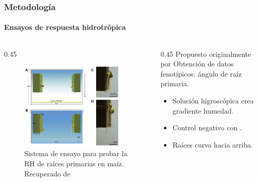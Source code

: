 \documentclass[9pt,aspectratio=169]{beamer}
\begin{document}
\begin{frame}
    \frametitle{Metodología}
    \framesubtitle{Ensayos de respuesta hidrotrópica}

\begin{columns}[c]
    \begin{column}{0.45\textwidth}
        \begin{figure}
            \centering
            \includegraphics[width=0.90\textwidth]{metodologia-ensayo-hidrotropico.png}
            \caption{Sistema de ensayo para probar la RH de raíces primarias en maíz. Recuperado de \textcite{eapen-2017-hidrotropismo}}
            \label{fig:ensayo-hidrotropico}
        \end{figure}
    \end{column}

    \begin{column}{0.45\textwidth}
        Propuesto originalmente por \textcite{eapen-2017-hidrotropismo}
        Obtención de datos fenotípicos: ángulo de raíz primaria.
        \begin{itemize}
            \item Solución higroscópica  crea gradiente humedad.
            \item Control negativo con .
            \item Raíces curva hacia arriba.
        \end{itemize}
    \end{column}
\end{columns}

    
\end{frame}
\end{document}
